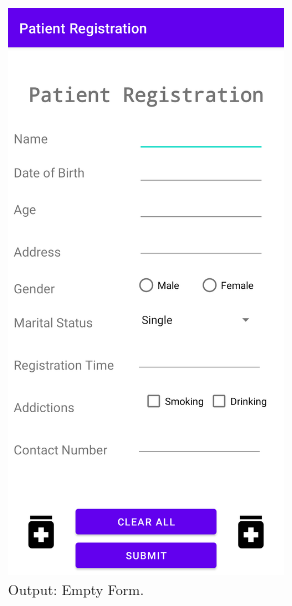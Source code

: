 \documentclass[12pt, a4]{article}
\begin{document}
\newpage
\subsection*{}
\begin{flushleft}

\end{flushleft}

\newpage
\subsection*{}
\begin{flushleft}

\end{flushleft}

\newpage
\subsection*{}
\begin{flushleft}

\end{flushleft}


\newpage
\subsection*{}
\begin{figure}[h]
\centering
\caption{Output: Empty Form.}
\includegraphics[height=15cm, width=7.3cm]{PatientRegistration/Screenshots/EmptyForm.png}
\end{figure}
\end{document}
